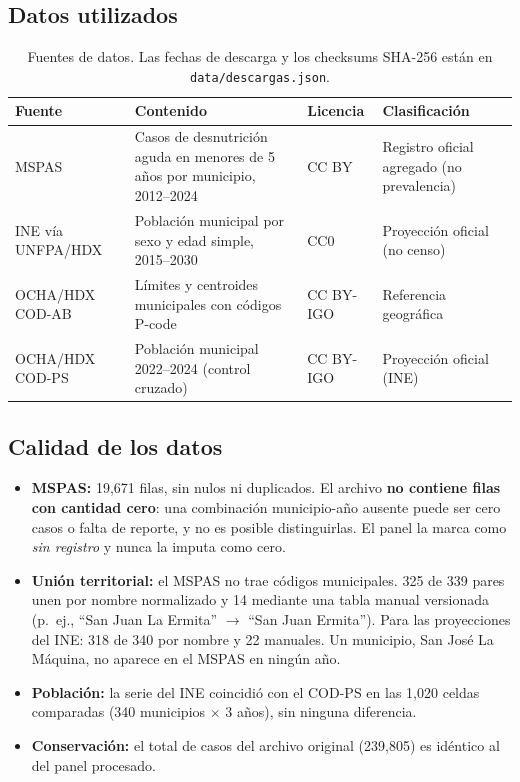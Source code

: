 \documentclass[11pt,letterpaper]{article}
\newcommand{\cod}[1]{\texttt{#1}}
\begin{document}
\subsection{Datos utilizados}

\begin{table}[htbp]
\centering
\small
\begin{tabularx}{\textwidth}{>{\raggedright\arraybackslash}p{3.2cm}L>{\raggedright\arraybackslash}p{2.4cm}L}
\toprule
Fuente & Contenido & Licencia & Clasificación \\
\midrule
MSPAS~\cite{mspas} & Casos de desnutrición aguda en menores de 5 años por municipio, 2012--2024 & CC BY & Registro oficial agregado (no prevalencia) \\
INE vía UNFPA/HDX~\cite{ine} & Población municipal por sexo y edad simple, 2015--2030 & CC0 & Proyección oficial (no censo) \\
OCHA/HDX COD-AB~\cite{codab} & Límites y centroides municipales con códigos P-code & CC BY-IGO & Referencia geográfica \\
OCHA/HDX COD-PS~\cite{codps} & Población municipal 2022--2024 (control cruzado) & CC BY-IGO & Proyección oficial (INE) \\
\bottomrule
\end{tabularx}
\caption{Fuentes de datos. Las fechas de descarga y los checksums SHA-256 están en \cod{data/descargas.json}.}
\label{tab:fuentes}
\end{table}

\subsection{Calidad de los datos}

\begin{itemize}
  \item \textbf{MSPAS:} 19{,}671 filas, sin nulos ni duplicados. El archivo \textbf{no contiene filas con cantidad cero}: una combinación municipio-año ausente puede ser cero casos o falta de reporte, y no es posible distinguirlas. El panel la marca como \emph{sin registro} y nunca la imputa como cero.
  \item \textbf{Unión territorial:} el MSPAS no trae códigos municipales. 325 de 339 pares unen por nombre normalizado y 14 mediante una tabla manual versionada (p.\ ej., ``San Juan La Ermita'' $\to$ ``San Juan Ermita''). Para las proyecciones del INE: 318 de 340 por nombre y 22 manuales. Un municipio, San José La Máquina, no aparece en el MSPAS en ningún año.
  \item \textbf{Población:} la serie del INE coincidió con el COD-PS en las 1{,}020 celdas comparadas (340 municipios $\times$ 3 años), sin ninguna diferencia.
  \item \textbf{Conservación:} el total de casos del archivo original (239{,}805) es idéntico al del panel procesado.
\end{itemize}
\end{document}
